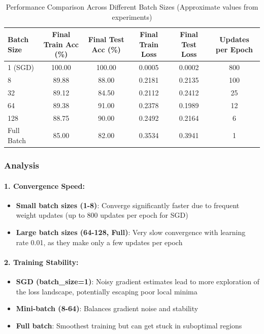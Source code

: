 \documentclass[11pt,a4paper]{article}
\begin{document}
\begin{table}[h]
\centering
\caption{Performance Comparison Across Different Batch Sizes (Approximate values from experiments)}
\label{tab:batch_comparison}
\begin{tabular}{@{}lccccc@{}}
\toprule
Batch Size & Final Train Acc (\%) & Final Test Acc (\%) & Final Train Loss & Final Test Loss & Updates per Epoch \\ \midrule
1 (SGD)    & 100.00               & 100.00              & 0.0005             & 0.0002              & 800              \\
8          & 89.88               & 88.00              & 0.2181            & 0.2135             & 100              \\
32         & 89.12               & 84.50              & 0.2112           & 0.2412             & 25               \\
64         & 89.38              & 91.00             & 0.2378            & 0.1989             & 12   \\
128        & 88.75               & 90.00              & 0.2492             & 0.2164              & 6                \\
Full Batch & 85.00              & 82.00             & 0.3534            & 0.3941             & 1                \\ \bottomrule
\end{tabular}
\end{table}

\subsubsection{Analysis}

\paragraph{1. Convergence Speed:}
\begin{itemize}
    \item \textbf{Small batch sizes (1-8)}: Converge significantly faster due to frequent weight updates (up to 800 updates per epoch for SGD)
    \item \textbf{Large batch sizes (64-128, Full)}: Very slow convergence with learning rate 0.01, as they make only a few updates per epoch
\end{itemize}

\paragraph{2. Training Stability:}
\begin{itemize}
    \item \textbf{SGD (batch\_size=1)}: Noisy gradient estimates lead to more exploration of the loss landscape, potentially escaping poor local minima
    \item \textbf{Mini-batch (8-64)}: Balances gradient noise and stability
    \item \textbf{Full batch}: Smoothest training but can get stuck in suboptimal regions
\end{itemize}
\end{document}
